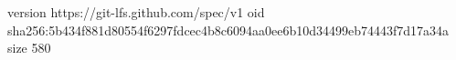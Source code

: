 version https://git-lfs.github.com/spec/v1
oid sha256:5b434f881d80554f6297fdcec4b8c6094aa0ee6b10d34499eb74443f7d17a34a
size 580
